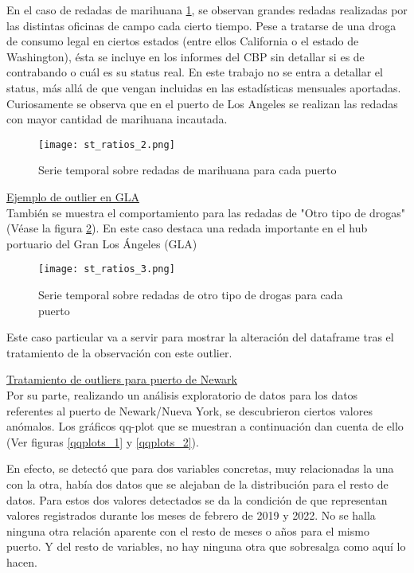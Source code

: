 \documentclass[12pt]{article}
\begin{document}
		En el caso de redadas de marihuana \ref{st_ratio_2}, se observan grandes redadas realizadas por las distintas oficinas de campo cada cierto tiempo. Pese a tratarse de una droga de consumo legal en ciertos estados (entre ellos California o el estado de Washington), ésta se incluye en los informes del CBP sin detallar si es de contrabando o cuál es su status real. En este trabajo no se entra a detallar el status, más allá de que vengan incluidas en las estadísticas mensuales aportadas. Curiosamente se observa que en el puerto de Los Angeles se realizan las redadas con mayor cantidad de marihuana incautada.
		
		\begin{figure}[H]
			\caption{\label{st_ratio_2} Serie temporal sobre redadas de marihuana para cada puerto}
			\centering
			\hspace*{1cm}
			\texttt{[image: st\_ratios\_2.png]}
		\end{figure}
	
	
		\underline{Ejemplo de outlier en GLA}\\
		También se muestra el comportamiento para las redadas de "Otro tipo de drogas" (Véase la figura \ref{st_ratio_3}). En este caso destaca una redada importante en el hub portuario del Gran Los Ángeles (GLA)
		
		\begin{figure}[H]
			\caption{\label{st_ratio_3} Serie temporal sobre redadas de otro tipo de drogas para cada puerto}
			\centering
			\hspace*{1cm}
			\texttt{[image: st\_ratios\_3.png]}
		\end{figure}
	
		Este caso particular va a servir para mostrar la alteración del dataframe tras el tratamiento de la observación con este outlier.
		
		\underline{Tratamiento de outliers para puerto de Newark}\\
		Por su parte, realizando un análisis exploratorio de datos para los datos referentes al puerto de Newark/Nueva York, se descubrieron ciertos valores anómalos. Los gráficos qq-plot que se muestran a continuación dan cuenta de ello (Ver figuras \ref{qqplots_1} y \ref{qqplots_2}).
		
		En efecto, se detectó que para dos variables concretas, muy relacionadas la una con la otra, había dos datos que se alejaban de la distribución para el resto de datos. Para estos dos valores detectados se da la condición de que representan valores registrados durante los meses de febrero de 2019 y 2022. No se halla ninguna otra relación aparente con el resto de meses o años para el mismo puerto. Y del resto de variables, no hay ninguna otra que sobresalga como aquí lo hacen.
		
\end{document}
